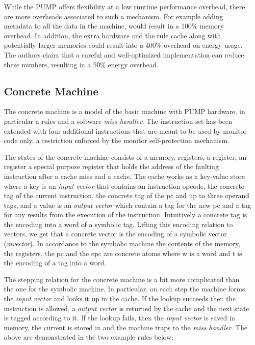 While the PUMP offers flexibility at a low runtime performance overhead, 
there are more overheads associated to such a mechanism. For example adding 
metadata to all the data in the machine, would result in a 100\% memory overhead.
In addition, the extra hardware and the rule cache along with potentially larger
memories could result into a 400\% overhead on energy usage. \cite{pump_ccs2014}
The authors claim that a careful and well-optimized implementation can reduce 
these numbers, resulting in a 50\% energy overhead.
%

\subsection{Concrete Machine}\label{sec:concrete}

The concrete machine is a model of the basic machine with PUMP hardware, 
in particular a rules \cache and a software \emph{miss handler}. 
The instruction set has been extended with four additional instructions that 
are meant to be used by monitor code only, a restriction enforced by the monitor
self-protection mechanism.

The states of the concrete machine consists of a memory, registers, a \pc 
register, an \epc register a special purpose register that holds the address of
the faulting instruction after a cache miss and a cache.
The cache works as a key-value store where a key is an \emph{input vector} that
contains an instruction opcode, the concrete tag of the current instruction,
the concrete tag of the pc and up to three operand tags, and a value is an 
\emph{output vector} which contain a tag for the new pc and a tag for any
results from the execution of the instruction. Intuitively a concrete tag is the
encoding into a word of a symbolic tag. 
Lifting this encoding relation to vectors, we get that a concrete vector is the
encoding of a symbolic vector (\emph{mvector}). 
In accordance  to the symbolic machine
the contents of the memory, the registers, the pc and the epc are concrete atoms
 where w is a word and t is the encoding of a tag into a word.

The stepping relation for the concrete machine is a bit more complicated than
the one for the symbolic machine. In particular, on each step the machine forms
the \emph{input vector} and looks it up in the cache. If the lookup succeeds 
then the instruction is allowed, a \emph{output vector} is returned by the
cache and the next state is tagged according to it. 
If the lookup fails, then the \emph{input vector} is saved in memory, the 
current \pc is stored in \epc and the machine traps to the \emph{miss handler}.
The above are demonstrated in the two example rules below:

